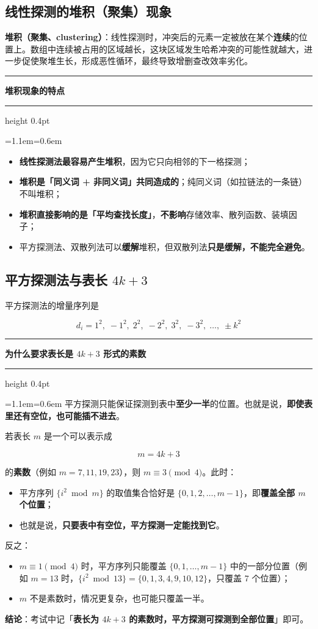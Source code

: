 \documentclass[11pt,openany,UTF8]{ctexbook}
\newcommand{\callouthead}[2]{%
  \par\addvspace{7pt}\noindent
  {\color{#1}\rule[-0.15em]{3pt}{1.05em}}\hspace{0.5em}%
  {\bfseries\color{#1}#2}\par\nobreak\vspace{-0.35em}%
  {\color{rulesep}\hrule height 0.4pt}\nobreak\vspace{0.45em}%
  \begingroup\small\setlength{\parindent}{0pt}%
  \leftskip=1.1em\rightskip=0.6em\noindent\ignorespaces}
\newcommand{\calloutend}{\par\endgroup\addvspace{7pt}}
\newenvironment{callkey}[1]{\callouthead{keybar}{#1}}{\calloutend}
\begin{document}
\subsection{线性探测的堆积（聚集）现象}

\textbf{堆积（聚集、clustering）}：线性探测时，冲突后的元素一定被放在某个\textbf{连续}的位置上。数组中连续被占用的区域越长，这块区域发生哈希冲突的可能性就越大，进一步促使聚堆生长，形成恶性循环，最终导致增删查改效率劣化。

\begin{callkey}{堆积现象的特点}
\begin{itemize}
\item \textbf{线性探测法最容易产生堆积}，因为它只向相邻的下一格探测；
\item \textbf{堆积是「同义词 + 非同义词」共同造成的}；纯同义词（如拉链法的一条链）不叫堆积；
\item \textbf{堆积直接影响的是「平均查找长度」}，\textbf{不影响}存储效率、散列函数、装填因子；
\item 平方探测法、双散列法可以\textbf{缓解}堆积，但双散列法\textbf{只是缓解，不能完全避免}。
\end{itemize}
\end{callkey}

\subsection{平方探测法与表长 $4k+3$}

平方探测法的增量序列是

\[d_i=1^{2},\;-1^{2},\;2^{2},\;-2^{2},\;3^{2},\;-3^{2},\;\ldots,\;\pm k^{2}\]

\begin{callkey}{为什么要求表长是 $4k+3$ 形式的素数}
平方探测只能保证探测到表中\textbf{至少一半}的位置。也就是说，\textbf{即使表里还有空位，也可能插不进去}。

若表长 $m$ 是一个可以表示成

\[m=4k+3\]

的\textbf{素数}（例如 $m=7,11,19,23$），则 $m\equiv 3\pmod 4$。此时：

\begin{itemize}
\item 平方序列 $\{i^{2}\bmod m\}$ 的取值集合恰好是 $\{0,1,2,\ldots,m-1\}$，即\textbf{覆盖全部 $m$ 个位置}；
\item 也就是说，\textbf{只要表中有空位，平方探测一定能找到它}。
\end{itemize}
反之：

\begin{itemize}
\item $m\equiv 1\pmod 4$ 时，平方序列只能覆盖 $\{0,1,\ldots,m-1\}$ 中的一部分位置（例如 $m=13$ 时，$\{i^2\bmod 13\}=\{0,1,3,4,9,10,12\}$，只覆盖 7 个位置）；
\item $m$ 不是素数时，情况更复杂，也可能只覆盖一半。
\end{itemize}
\textbf{结论}：考试中记「\textbf{表长为 $4k+3$ 的素数时，平方探测可探测到全部位置}」即可。

\end{callkey}
\end{document}
